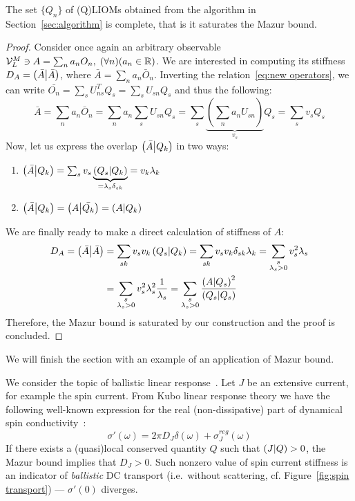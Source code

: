 \begin{proposition}
  The set \(\{Q_n\}\) of (Q)LIOMs obtained from the algorithm in Section~\ref{sec:algorithm} is complete,
  that is it saturates the Mazur bound. 
\label{prop:saturation}
\end{proposition}
\begin{proof}
  Consider once again an arbitrary observable \(\mathcal{V}_L^M \ni A = \sum_n a_n O_n,\; 
  (\forall n) (a_n \in \mathbb{R})\). We are interested in computing its stiffness \(D_A = \left(\bar{A} \middle| \bar{A}\right)\), 
  where \(\bar{A} = \sum_n a_n \bar{O}_n\). Inverting the relation~\eqref{eq:new operators}, we can write 
  \(\bar{O_n} = \sum_s U_{ns}^T Q_s = \sum_s U_{sn} Q_s\) and thus the following:
  \begin{equation*}
    \bar{A} = \sum_n a_n \bar{O}_n = \sum_n a_n \sum_s U_{sn} Q_s =
    \sum_s \underbrace{\left(\sum_n a_n U_{sn}\right)}_{v_s} Q_s = \sum_s v_s Q_s
  \end{equation*}
  Now, let us express the overlap \(\left(\bar{A} \middle| Q_k\right)\) in two ways:
  \begin{enumerate}
    \item \(\left(\bar{A} \middle| Q_k\right) = \sum_s v_s \underbrace{\left(Q_s \middle| Q_k\right)}_{=\lambda_s \delta_{sk}} = v_k \lambda_k\)
    \item \(\left(\bar{A} \middle| Q_k\right) = \left(A \middle| \bar{Q_k}\right) = \left(A \middle| Q_k\right)\)
  \end{enumerate}
  We are finally ready to make a direct calculation of stiffness of \(A\):
  \begin{align*}
    D_A = \left(\bar{A} \middle| \bar{A}\right) &= \sum_{sk} v_s v_k \left(Q_s \middle| Q_k\right) = \sum_{sk} v_s v_k \delta_{sk} \lambda_{k} = 
    \sum_{\substack{s\\\lambda_s > 0}} v_s^2 \lambda_s \\
    &= \sum_{\substack{s\\\lambda_s > 0}} v_s^2 \lambda_s^2 \frac{1}{\lambda_s} = 
    \sum_{\substack{s\\\lambda_s > 0}} \frac{\left(A \middle| Q_s\right)^2}{\left(Q_s \middle| Q_s\right)}
  \end{align*}
  Therefore, the Mazur bound is saturated by our construction and the proof is concluded.
\end{proof}
We will finish the section with an example of an application of Mazur bound. 
\begin{example}
  We consider the topic of ballistic linear response~\autocite{Ilievski2016a}. Let \(J\) be an extensive current,
  for example the spin current. From Kubo linear response theory
  we have the following well-known expression for the real (non-dissipative) part of dynamical
  spin conductivity~\autocite{Zotos1996}:
  \begin{equation}
    \sigma'(\omega) = 2 \pi D_J \delta(\omega) + \sigma_J^{reg}(\omega)
  \label{eq:conductivity}
  \end{equation}
If there exists a (quasi)local conserved quantity \(Q\) such that \(\left(J \middle| Q\right)>0\), the Mazur bound
implies that \(D_J > 0\). Such nonzero value of spin current stiffness is an indicator of \textit{ballistic}
DC transport (i.e.\ without scattering, cf. Figure~\ref{fig:spin transport}) --- \(\sigma'(0)\) diverges. 
\end{example}
